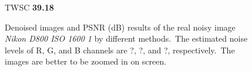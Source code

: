 \begin{figure}
{\begin{minipage}[t]{0.19\textwidth}
{\footnotesize TWSC \textbf{39.18}}
\end{minipage}
}
    \caption{Denoised images and PSNR (dB) results of the real noisy image \textsl{Nikon D800 ISO 1600 1} \cite{crosschannel2016} by different methods.\ The estimated noise levels of R, G, and B channels are ?, ?, and ?, respectively.\ The images are better to be zoomed in on screen.}
    \label{fig5-13}
\end{figure}


\begin{figure}
    \centering
{}
\end{figure}
